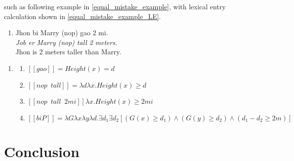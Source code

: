 \documentclass{ctexart}
\begin{document}
such as following example in \ref{equal_mistake_example}, with lexical entry calculation shown in \ref{equal_mistake_example_LE}.

\begin{enumerate}[resume]
    \item \label{equal_mistake_example}
    Jhon bi Marry (nop) gao 2 mi. \\
    \textit{Job er Marry (nop) tall 2 meters.}    \\
    Jhon is 2 meters taller than Marry.
\end{enumerate}

\begin{enumerate}[resume]
    \item \label{equal_mistake_example_LE}
    \begin{enumerate}[ref=(\arabic{enumi}\alph*)]
        \item $[\![gao]\!]=Height(x)=d$
        \item $[\![nop \enspace tall]\!] = \lambda d \lambda x.Height(x) \geq d$
        \item $[\![nop \enspace tall \enspace 2mi]\!] \lambda x.Height(x) \geq 2mi$ 
        \item $[\![biP]\!]=\lambda G \lambda x \lambda y \lambda d. \exists d_1 \exists d_2 [(G(x) \geq d_1) \land (G(y) \geq d_2) \land (d_1-d_2 \geq 2m) ]$
    \end{enumerate}
\end{enumerate} 




\section{Conclusion}

\newpage

\printbibliography
\end{document}
